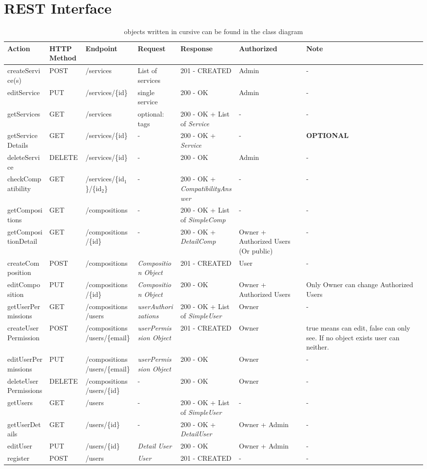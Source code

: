 \documentclass[11pt]{article}
\author{Christian Richter}
\date{\today}
\title{}
\begin{document}
\section{REST Interface}
\label{sec:org2f4ad02}
\begin{table}[htbp]
\caption{objects written in cursive can be found in the class diagram}
\centering
\begin{tabular}{lllllll}
Action & HTTP Method & Endpoint & Request & Response & Authorized & Note\\
\hline
createService(s) & POST & /services & List of services & 201 - CREATED & Admin & -\\
editService & PUT & /services/\{id\} & single service & 200 - OK & Admin & -\\
getServices & GET & /services & optional: tags & 200 - OK + List of \emph{Service} & - & -\\
getServiceDetails & GET & /services/\{id\} & - & 200 - OK + \emph{Service} & - & \textbf{OPTIONAL}\\
deleteService & DELETE & /services/\{id\} & - & 200 - OK & Admin & -\\
\hline
checkCompatibility & GET & /services/\{id\(_{\text{1}}\)\}/\{id\(_{\text{2}}\)\} & - & 200 - OK + \emph{CompatibilityAnswer} & - & -\\
\hline
getCompositions & GET & /compositions & - & 200 - OK + List of \emph{SimpleComp} & - & -\\
getCompositionDetail & GET & /compositions/\{id\} & - & 200 - OK + \emph{DetailComp} & Owner + Authorized Users (Or public) & -\\
createComposition & POST & /compositions & \emph{Composition Object} & 201 - CREATED & User & -\\
editComposition & PUT & /compositions/\{id\} & \emph{Composition Object} & 200 - OK & Owner + Authorized Users & Only Owner can change Authorized Users\\
\hline
getUserPermissions & GET & /compositions/users & \emph{userAuthorizations} & 200 - OK + List of \emph{SimpleUser} & Owner & -\\
createUserPermission & POST & /compositions/users/\{email\} & \emph{userPermission Object} & 201 - CREATED & Owner & true means can edit, false can only see. If no object exists user can neither.\\
editUserPermissions & PUT & /compositions/users/\{email\} & \emph{userPermission Object} & 200 - OK & Owner & -\\
deleteUserPermissions & DELETE & /compositions/users/\{id\} & - & 200 - OK & Owner & -\\
\hline
getUsers & GET & /users & - & 200 - OK + List of \emph{SimpleUser} & - & -\\
getUserDetails & GET & /users/\{id\} & - & 200 - OK + \emph{DetailUser} & Owner + Admin & -\\
editUser & PUT & /users/\{id\} & \emph{Detail User} & 200 - OK & Owner + Admin & -\\
register & POST & /users & \emph{User} & 201 - CREATED & - & -\\
\hline
\end{tabular}
\end{table}
\end{document}
